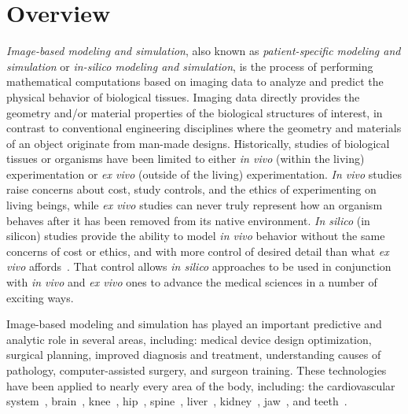 \chapter{Overview}
\textit{Image-based modeling and simulation}, also known as \textit{patient-specific modeling and simulation} or \textit{in-silico modeling and simulation}, is the process of performing mathematical computations based on imaging data to analyze and predict the physical behavior of biological tissues. Imaging data directly provides the geometry and/or material properties of the biological structures of interest, in contrast to conventional engineering disciplines where the geometry and materials of an object originate from man-made designs. Historically, studies of biological tissues or organisms have been limited to either \textit{in vivo} (within the living) experimentation or \textit{ex vivo} (outside of the living) experimentation. \textit{In vivo} studies raise concerns about cost, study controls, and the ethics of experimenting on living beings, while \textit{ex vivo} studies can never truly represent how an organism behaves after it has been removed from its native environment. \textit{In silico} (in silicon) studies provide the ability to model \textit{in vivo} behavior without the same concerns of cost or ethics, and with more control of desired detail than what \textit{ex vivo} affords~\cite{colquitt_2011}. That control allows \textit{in silico} approaches to be used in conjunction with \textit{in vivo} and \textit{ex vivo} ones to advance the medical sciences in a number of exciting ways.


Image-based modeling and simulation has played an important predictive and analytic role in several areas, including:  medical device design optimization,  surgical planning, improved diagnosis and treatment, understanding causes of pathology, computer-assisted surgery, and surgeon training. These technologies have been applied to nearly every area of the body, including: the cardiovascular system~\cite{min_2015, updegrove_2016}, brain~\cite{weickenmeier_2016, behnia_2008}, knee~\cite{erdemir_2015, donahue_2002}, hip~\cite{anderson_2008, el'sheikh_2003}, spine~\cite{malandrino_2014, dumas_2005}, liver~\cite{shi_2008, schwen_2014}, kidney~\cite{eloot_2002, snedeker_2005}, jaw~\cite{idrus_2017, narra_2014}, and teeth~\cite{frisardi_2011, geng_2001}. 

